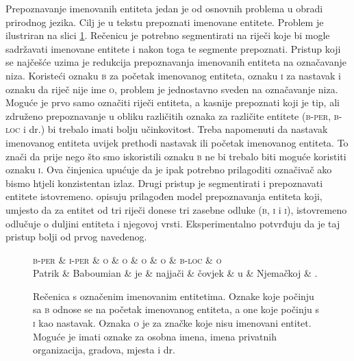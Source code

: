 Prepoznavanje imenovanih entiteta  jedan je od
osnovnih problema u obradi prirodnog jezika. Cilj je u tekstu prepoznati
imenovane entitete. Problem je ilustriran na slici
\ref{fig:namedentityrecognition}. Rečenicu je potrebno segmentirati na riječi
koje bi mogle sadržavati imenovane entitete i nakon toga te segmente prepoznati.
Pristup koji se najčešće uzima je redukcija prepoznavanja imenovanih entiteta na
označavanje niza. Koristeći oznaku \textsc{b} za početak imenovanog entiteta,
oznaku \textsc{i} za nastavak i oznaku da riječ nije ime \textsc{o}, problem je
jednostavno sveden na označavanje niza. Moguće je prvo samo označiti riječi
entiteta, a kasnije prepoznati koji je tip, ali združeno prepoznavanje u obliku
različitih oznaka za različite entitete (\textsc{b-per}, \textsc{b-loc} i dr.)
bi trebalo imati bolju učinkovitost. Treba napomenuti da nastavak imenovanog
entiteta uvijek prethodi nastavak ili početak imenovanog entiteta. To znači da
prije nego što smo iskoristili oznaku \textsc{b} ne bi trebalo biti moguće
koristiti oznaku \textsc{i}. Ova činjenica upućuje da je ipak potrebno
prilagoditi označivač ako bismo htjeli konzistentan izlaz. Drugi pristup je
segmentirati i prepoznavati entitete istovremeno. \citet{sarawagi2004semi}
opisuju prilagođen model prepoznavanja entiteta koji, umjesto da za entitet od
tri riječi donese tri zasebne odluke (\textsc{b}, \textsc{i} i \textsc{i}),
istovremeno odlučuje o duljini entiteta i njegovoj vrsti. Eksperimentalno
potvrđuju da je taj pristup bolji od prvog navedenog.

\begin{figure}[H]
\centering
\begin{dependency}
\begin{deptext}
  \textsc{b-per} \& \textsc{i-per} \& \textsc{o} \& \textsc{o} \& \textsc{o} \& \textsc{o} \& \textsc{b-loc} \& \textsc{o} \\
  Patrik         \& Baboumian      \& je         \& najjači    \& čovjek     \& u          \& Njemačkoj      \& .          \\
\end{deptext}
\end{dependency}
\caption[Rečenica s označenim imenovanim entitetima.]{Rečenica s označenim
imenovanim entitetima. Oznake koje počinju sa \textsc{b} odnose se na početak
imenovanog entiteta, a one koje počinju s \textsc{i} kao nastavak. Oznaka
\textsc{o} je za značke koje nisu imenovani entitet. Moguće je imati oznake za
osobna imena, imena privatnih organizacija, gradova, mjesta i dr.}
\label{fig:namedentityrecognition}
\end{figure}


